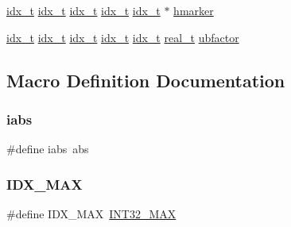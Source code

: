 \begin{DoxyCompactItemize}
\item 
\hyperlink{a00876_aaa5262be3e700770163401acb0150f52}{idx\+\_\+t} \hyperlink{a00876_aaa5262be3e700770163401acb0150f52}{idx\+\_\+t} \hyperlink{a00876_aaa5262be3e700770163401acb0150f52}{idx\+\_\+t} \hyperlink{a00876_aaa5262be3e700770163401acb0150f52}{idx\+\_\+t} \hyperlink{a00876_aaa5262be3e700770163401acb0150f52}{idx\+\_\+t} $\ast$ \hyperlink{a00879_a2d0a403870cf657adf972e808622d7c7}{hmarker}
\item 
\hyperlink{a00876_aaa5262be3e700770163401acb0150f52}{idx\+\_\+t} \hyperlink{a00876_aaa5262be3e700770163401acb0150f52}{idx\+\_\+t} \hyperlink{a00876_aaa5262be3e700770163401acb0150f52}{idx\+\_\+t} \hyperlink{a00876_aaa5262be3e700770163401acb0150f52}{idx\+\_\+t} \hyperlink{a00876_aaa5262be3e700770163401acb0150f52}{idx\+\_\+t} \hyperlink{a00876_a1924a4f6907cc3833213aba1f07fcbe9}{real\+\_\+t} \hyperlink{a00879_a32dfbc289fd431c9ca9aca2e6fb3e7b8}{ubfactor}
\end{DoxyCompactItemize}


\subsection{Macro Definition Documentation}
\mbox{\label{a00879_a4e78ddb52240687b065c7889e7ab5b99}} 
\subsubsection{\texorpdfstring{iabs}{iabs}}
{\footnotesize\ttfamily \#define iabs~abs}

\mbox{\label{a00879_a45ec4ebc9cf3a56a496d1de33fdfd7c5}} 
\subsubsection{\texorpdfstring{I\+D\+X\+\_\+\+M\+AX}{IDX\_MAX}}
{\footnotesize\ttfamily \#define I\+D\+X\+\_\+\+M\+AX~\hyperlink{a00119_a181807730d4a375f848ba139813ce04f}{I\+N\+T32\+\_\+\+M\+AX}}

\mbox{\label{a00879_a32a0bbbc935a66ae4a7cd06fc713d7f7}} 
